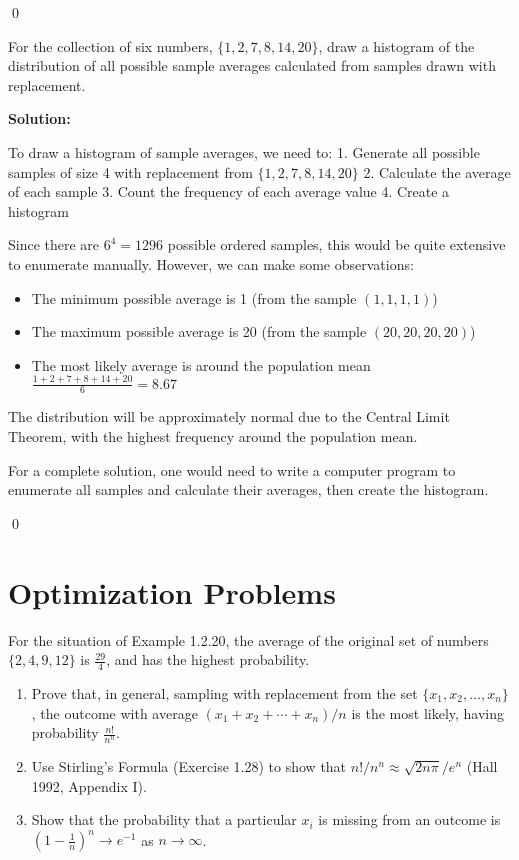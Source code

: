 \qed
\begin{problembox}
For the collection of six numbers, $\{1,2,7,8,14,20\}$, draw a histogram of the distribution of all possible sample averages calculated from samples drawn with replacement.
\end{problembox}

\noindent\textbf{Solution:}

To draw a histogram of sample averages, we need to:
1. Generate all possible samples of size 4 with replacement from $\{1,2,7,8,14,20\}$
2. Calculate the average of each sample
3. Count the frequency of each average value
4. Create a histogram

Since there are $6^4 = 1296$ possible ordered samples, this would be quite extensive to enumerate manually. However, we can make some observations:

\begin{itemize}
\item The minimum possible average is 1 (from the sample $(1,1,1,1)$)
\item The maximum possible average is 20 (from the sample $(20,20,20,20)$)
\item The most likely average is around the population mean $\frac{1+2+7+8+14+20}{6} = 8.67$
\end{itemize}

The distribution will be approximately normal due to the Central Limit Theorem, with the highest frequency around the population mean.

For a complete solution, one would need to write a computer program to enumerate all samples and calculate their averages, then create the histogram.



\qed
\section{Optimization Problems}

\begin{problembox}
For the situation of Example 1.2.20, the average of the original set of numbers $\{2,4,9,12\}$ is $\frac{29}{4}$, and has the highest probability.
\begin{enumerate}[label=(\alph*)]
    \item Prove that, in general, sampling with replacement from the set $\{x_{1},x_{2},\ldots,x_{n}\}$, the outcome with average $(x_{1}+x_{2}+\cdots+x_{n})/n$ is the most likely, having probability $\frac{n!}{n^{n}}$.
    \item Use Stirling's Formula (Exercise 1.28) to show that $n!/n^{n}\approx\sqrt{2n\pi}/e^{n}$ (Hall 1992, Appendix I).
    \item Show that the probability that a particular $x_{i}$ is missing from an outcome is $(1-\frac{1}{n})^{n}\to e^{-1}$ as $n\to\infty$.
\end{enumerate}
\end{problembox}

